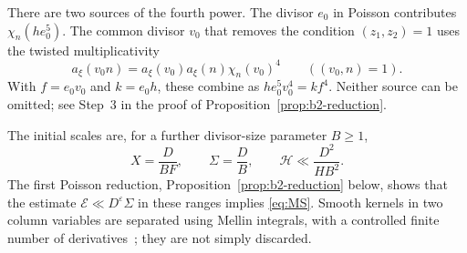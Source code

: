 \documentclass[11pt]{article}
\numberwithin{equation}{section}
\newcommand{\E}{\mathcal E}
\begin{document}
There are two sources of the fourth power. The divisor $e_0$ in
Poisson contributes $\chi_n(he_0^5)$. The common divisor $v_0$ that removes the
condition $(z_1,z_2)=1$ uses the twisted multiplicativity
\begin{equation}\label{eq:d038}
 a_\xi(v_0n)=a_\xi(v_0)a_\xi(n)\chi_n(v_0)^4
 \qquad((v_0,n)=1).
\end{equation}
With $f=e_0v_0$ and $k=e_0h$, these combine as
$he_0^5v_0^4=kf^4$. Neither source can be omitted; see Step~3 in the proof of
Proposition~\ref{prop:b2-reduction}.

The initial scales are, for a further divisor-size parameter $B\ge1$,
\begin{equation}\label{eq:initial}
 X=\frac D{BF},\qquad \Sigma=\frac DB,\qquad
 \mathcal H\ll\frac{D^2}{HB^2}.
\end{equation}
The first Poisson reduction, Proposition~\ref{prop:b2-reduction} below, shows that the
estimate $\E\ll D^\varepsilon\Sigma$ in these ranges implies
\eqref{eq:MS}. Smooth kernels in two column variables are separated
using Mellin integrals, with a controlled finite number of
derivatives~\cite[Lemma~B.2]{OAI1112}; they are not simply discarded.
\end{document}
